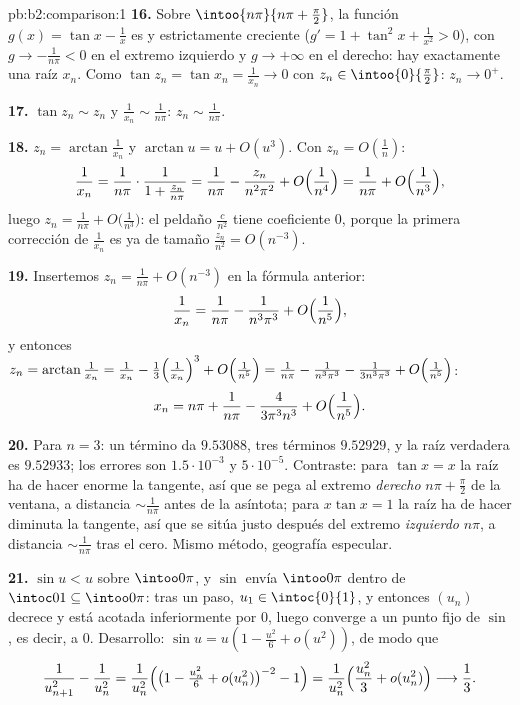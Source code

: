 \begin{solution}{pb:b2:comparison:1}
\textbf{16.} Sobre $\intoo{n\pi}{n\pi + \frac\pi2}$, la función
$g(x) = \tan x - \frac1x$ es  y estrictamente creciente
($g' = 1 + \tan^2x + \frac1{x^2} > 0$), con $g \to -\frac1{n\pi}
< 0$ en el extremo izquierdo y $g \to +\infty$ en el derecho:
hay exactamente una raíz $x_n$. Como $\tan z_n = \tan x_n =
\frac1{x_n} \to 0$ con $z_n \in \intoo{0}{\frac\pi2}$: $z_n \to
0^+$.

\textbf{17.} $\tan z_n \sim z_n$ y $\frac1{x_n} \sim
\frac1{n\pi}$: $z_n \sim \frac1{n\pi}$.

\textbf{18.} $z_n = \arctan\frac1{x_n}$ y $\arctan u = u +
O(u^3)$. Con $z_n = O(\frac1n)$:
\[
\frac1{x_n} = \frac{1}{n\pi}\cdot\frac1{1 + \frac{z_n}{n\pi}}
= \frac1{n\pi} - \frac{z_n}{n^2\pi^2} +
O\Bigl(\frac1{n^4}\Bigr)
= \frac1{n\pi} + O\Bigl(\frac1{n^3}\Bigr),
\]
luego $z_n = \frac1{n\pi} + O\bigl(\frac1{n^3}\bigr)$: el peldaño
$\frac{c}{n^2}$ tiene coeficiente $0$, porque la primera
corrección de $\frac1{x_n}$ es ya de tamaño $\frac{z_n}{n^2} =
O(n^{-3})$.

\textbf{19.} Insertemos $z_n = \frac1{n\pi} + O(n^{-3})$ en la
fórmula anterior:
\[
\frac{1}{x_n} = \frac{1}{n\pi} - \frac{1}{n^3\pi^3} +
O\Bigl(\frac1{n^5}\Bigr),
\]
y entonces $z_n = \arctan\frac1{x_n} = \frac1{x_n} -
\frac{1}{3}\Bigl(\frac1{x_n}\Bigr)^3 + O\Bigl(\frac1{n^5}\Bigr)
= \frac1{n\pi} - \frac{1}{n^3\pi^3} - \frac{1}{3n^3\pi^3} +
O\Bigl(\frac1{n^5}\Bigr)$:
\[
x_n = n\pi + \frac{1}{n\pi} - \frac{4}{3\pi^3n^3} +
O\Bigl(\frac1{n^5}\Bigr).
\]

\textbf{20.} Para $n = 3$: un término da $9.53088$, tres términos
$9.52929$, y la raíz verdadera es $9.52933$; los errores son
$1.5\cdot10^{-3}$ y $5\cdot10^{-5}$. Contraste: para $\tan x = x$
la raíz ha de hacer enorme la tangente, así que se pega al
extremo \emph{derecho} $n\pi + \frac\pi2$ de la ventana, a
distancia $\sim\frac1{n\pi}$ antes de la asíntota; para $x\tan x
= 1$ la raíz ha de hacer diminuta la tangente, así que se sitúa
justo después del extremo \emph{izquierdo} $n\pi$, a distancia
$\sim\frac1{n\pi}$ tras el cero. Mismo método, geografía
especular.

\textbf{21.} $\sin u < u$ sobre $\intoo0\pi$, y $\sin$ envía
$\intoo0\pi$ dentro de $\intoc01 \subseteq \intoo0\pi$: tras un
paso, $u_1 \in \intoc{0}{1}$, y entonces $(u_n)$ decrece y está
acotada inferiormente por $0$, luego converge a un punto fijo de
$\sin$, es decir, a $0$. Desarrollo: $\sin u = u(1 - \frac{u^2}6
+ o(u^2))$, de modo que
\[
\frac{1}{u_{n+1}^2} - \frac1{u_n^2}
= \frac{1}{u_n^2}\Bigl(\bigl(1 - \tfrac{u_n^2}6 +
o(u_n^2)\bigr)^{-2} - 1\Bigr)
= \frac{1}{u_n^2}\Bigl(\frac{u_n^2}{3} + o(u_n^2)\Bigr)
\longrightarrow \frac13 .
\]


\end{solution}
